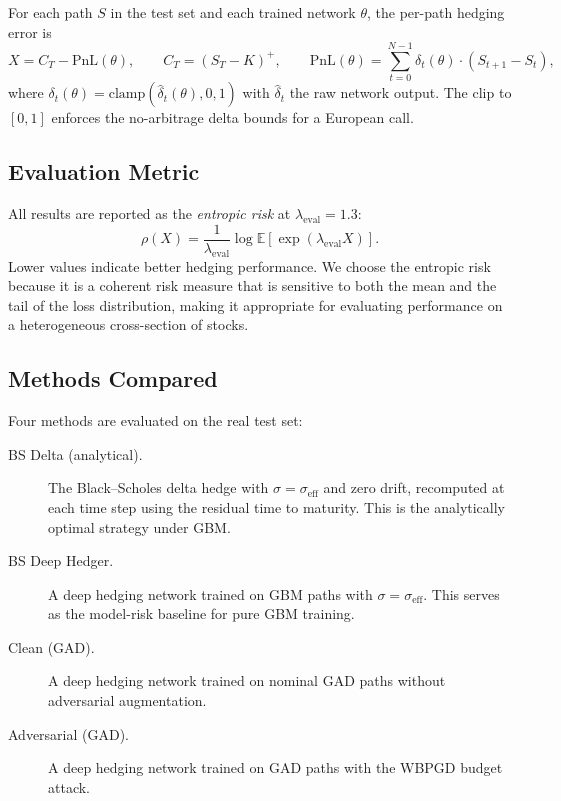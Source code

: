 For each path $S$ in the test set and each trained network $\theta$, the
per-path hedging error is
\begin{equation}
  X = C_T - \mathrm{PnL}(\theta),
  \qquad
  C_T = (S_T - K)^+,
  \qquad
  \mathrm{PnL}(\theta) = \sum_{t=0}^{N-1} \delta_t(\theta) \cdot (S_{t+1} - S_t),
  \label{eq:hedging_error}
\end{equation}
where $\delta_t(\theta) = \mathrm{clamp}(\hat{\delta}_t(\theta), 0, 1)$ with
$\hat{\delta}_t$ the raw network output.  The clip to $[0,1]$ enforces the
no-arbitrage delta bounds for a European call.

\subsection{Evaluation Metric}

All results are reported as the \emph{entropic risk} at
$\lambda_{\mathrm{eval}} = 1.3$:
\begin{equation}
  \rho(X)
  = \frac{1}{\lambda_{\mathrm{eval}}}
    \log\mathbb{E}\!\left[\exp(\lambda_{\mathrm{eval}} X)\right].
  \label{eq:entropic_risk_eval}
\end{equation}
Lower values indicate better hedging performance.  We choose the entropic
risk because it is a coherent risk measure that is sensitive to both the
mean and the tail of the loss distribution, making it appropriate for
evaluating performance on a heterogeneous cross-section of stocks.

\subsection{Methods Compared}

Four methods are evaluated on the real test set:

\begin{description}
  \item[BS Delta (analytical).]  The Black--Scholes delta hedge with
        $\sigma = \sigma_{\mathrm{eff}}$ and zero drift, recomputed at each
        time step using the residual time to maturity.  This is the
        analytically optimal strategy under GBM.

  \item[BS Deep Hedger.]  A deep hedging network trained on GBM paths with
        $\sigma = \sigma_{\mathrm{eff}}$.  This serves as the model-risk
        baseline for pure GBM training.

  \item[Clean (GAD).]  A deep hedging network trained on nominal GAD paths
        without adversarial augmentation.

  \item[Adversarial (GAD).]  A deep hedging network trained on GAD paths
        with the WBPGD budget attack.
\end{description}

